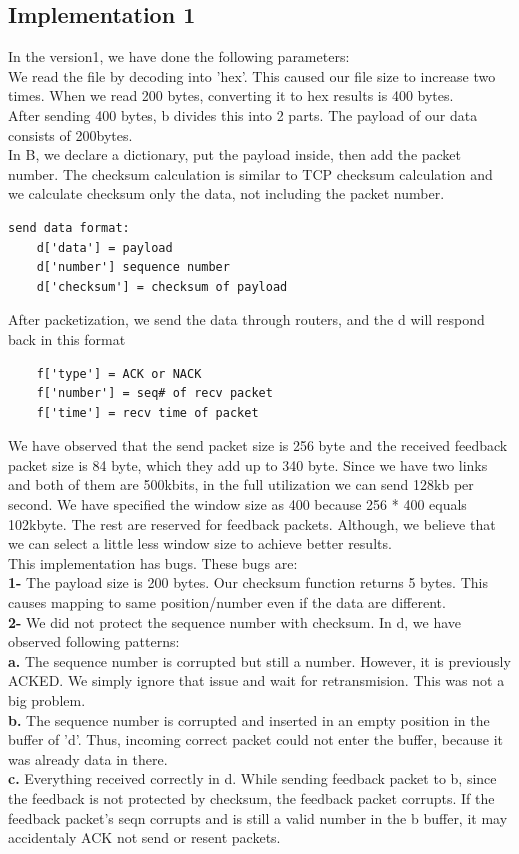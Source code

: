 \documentclass[12pt,journal,compsoc]{IEEEtran}
\begin{document}
\subsection{Implementation 1}
In the version1, we have done the following parameters:\\
We read the file by decoding into 'hex'. This caused our file size to increase two times. When we read 200 bytes, converting it to hex results is 400 bytes.\\
After sending 400 bytes, b divides this into 2 parts. The payload of our data consists of 200bytes.\\
In B, we declare a dictionary, put the payload inside, then add the packet number. The checksum calculation is similar to TCP checksum calculation and we calculate checksum only the data, not including the packet number.\\
\begin{verbatim}
send data format:
	d['data'] = payload
	d['number'] sequence number
	d['checksum'] = checksum of payload
\end{verbatim}
After packetization, we send the data through routers, and the d will respond back in this format\\
\begin{verbatim}
	f['type'] = ACK or NACK
	f['number'] = seq# of recv packet
	f['time'] = recv time of packet
\end{verbatim}
We have observed that the send packet size is 256 byte and the received feedback packet size is 84 byte, which they add up to 340 byte. Since we have two links and both of them are 500kbits, in the full utilization we can send 128kb per second. We have specified the window size as 400 because 256 * 400 equals 102kbyte. The rest are reserved for feedback packets. Although, we believe that we can select a little less window size to achieve better results.\\
This implementation has bugs. These bugs are:\\
\textbf{1-} The payload size is 200 bytes. Our checksum function returns 5 bytes. This causes mapping to same position/number even if the data are different.\\
\textbf{2-} We did not protect the sequence number with checksum. In d, we have observed following patterns:\\
\textbf{a.} The sequence number is corrupted but still a number. However, it is previously ACKED. We simply ignore that issue and wait for retransmision. This was not a big problem.\\
\textbf{b.} The sequence number is corrupted and inserted in an empty position in the buffer of 'd'. Thus, incoming correct packet could not enter the buffer, because it was already data in there.\\
\textbf{c.} Everything received correctly in d. While sending feedback packet to b, since the feedback is not protected by checksum, the feedback packet corrupts. If the feedback packet's seqn corrupts and is still a valid number in the b buffer, it may accidentaly ACK not send or resent packets.\\
\end{document}
